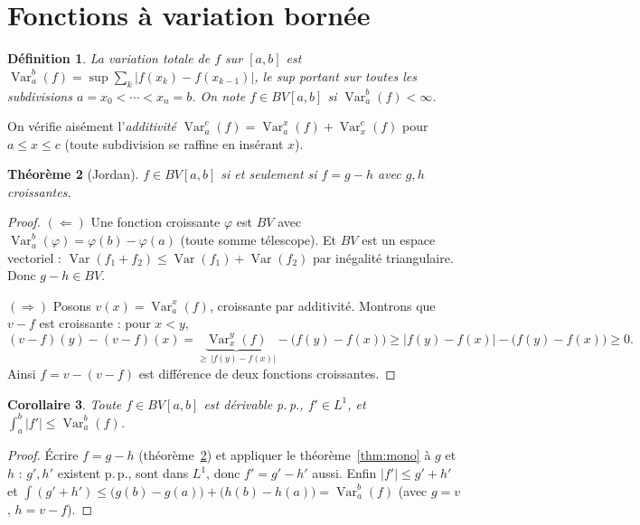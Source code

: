 \documentclass[11pt]{article}
\theoremstyle{thmblue}
\newtheorem{theoreme}{Théorème}[section]
\newtheorem{corollaire}[theoreme]{Corollaire}
\theoremstyle{defplain}
\newtheorem{definition}[theoreme]{Définition}
\theoremstyle{rem}
\newcommand{\Var}{\operatorname{Var}}
\newcommand{\pp}{p.\,p.}
\newcommand{\abs}[1]{\left\lvert #1 \right\rvert}
\begin{document}
\section{Fonctions à variation bornée}

\begin{definition}
La \emph{variation totale} de $f$ sur $[a,b]$ est
$\Var_a^b(f)=\sup\sum_{k}\abs{f(x_k)-f(x_{k-1})}$, le sup portant sur toutes les subdivisions
$a=x_0<\cdots<x_n=b$. On note $f\in BV[a,b]$ si $\Var_a^b(f)<\infty$.
\end{definition}

On vérifie aisément l'\emph{additivité} $\Var_a^c(f)=\Var_a^x(f)+\Var_x^c(f)$ pour $a\le x\le c$
(toute subdivision se raffine en insérant $x$).

\begin{theoreme}[Jordan]\label{thm:jordan}
$f\in BV[a,b]$ si et seulement si $f=g-h$ avec $g,h$ croissantes.
\end{theoreme}

\begin{proof}
$(\Leftarrow)$ Une fonction croissante $\varphi$ est $BV$ avec $\Var_a^b(\varphi)=\varphi(b)-\varphi(a)$
(toute somme télescope). Et $BV$ est un espace vectoriel : $\Var(f_1+f_2)\le\Var(f_1)+\Var(f_2)$ par
inégalité triangulaire. Donc $g-h\in BV$.

$(\Rightarrow)$ Posons $v(x)=\Var_a^x(f)$, croissante par additivité. Montrons que $v-f$ est
croissante : pour $x<y$,
\[
(v-f)(y)-(v-f)(x)=\underbrace{\Var_x^y(f)}_{\ge\,\abs{f(y)-f(x)}}-\bigl(f(y)-f(x)\bigr)\ge
\abs{f(y)-f(x)}-\bigl(f(y)-f(x)\bigr)\ge0.
\]
Ainsi $f=v-(v-f)$ est différence de deux fonctions croissantes.
\end{proof}

\begin{corollaire}\label{cor:bv}
Toute $f\in BV[a,b]$ est dérivable \pp, $f'\in L^1$, et $\int_a^b\abs{f'}\le\Var_a^b(f)$.
\end{corollaire}

\begin{proof}
Écrire $f=g-h$ (théorème~\ref{thm:jordan}) et appliquer le théorème~\ref{thm:mono} à $g$ et $h$ :
$g',h'$ existent \pp, sont dans $L^1$, donc $f'=g'-h'$ aussi. Enfin $\abs{f'}\le g'+h'$ et
$\int(g'+h')\le\bigl(g(b)-g(a)\bigr)+\bigl(h(b)-h(a)\bigr)=\Var_a^b(f)$ (avec $g=v$, $h=v-f$).
\end{proof}
\end{document}
